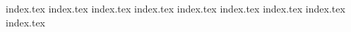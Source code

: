 {index.tex}
{index.tex}
{index.tex}
{index.tex}
{index.tex}
{index.tex}
{index.tex}
{index.tex}
{index.tex}
